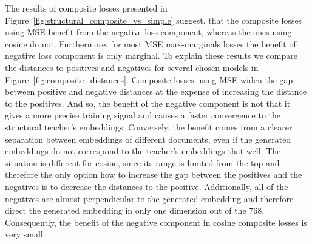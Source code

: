 The results of composite losses presented in
Figure~\ref{fig:structural_composite_vs_simple} suggest, that the composite
losses using MSE benefit from the negative loss component, whereas the ones
using cosine do not. Furthermore, for most MSE max-marginals losses the benefit
of negative loss component is only marginal. To explain these results we
compare the distances to positives and negatives for several chosen models in
Figure~\ref{fig:composite_distances}. Composite losses using MSE widen the gap
between positive and negative distances at the expense of increasing the
distance to the positives. And so, the benefit of the negative component is not
that it gives a more precise training signal and causes a faster convergence to
the structural teacher's embeddings. Conversely, the benefit comes from a
clearer separation between embeddings of different documents, even if the
generated embeddings do not correspond to the teacher's embeddings that well.
The situation is different for cosine, since its range is limited from the top
and therefore the only option how to increase the gap between the positives and
the negatives is to decrease the distances to the positive. Additionally, all
of the negatives are almost perpendicular to the generated embedding and
therefore direct the generated embedding in only one dimension out of the 768.
Consequently, the benefit of the negative component in cosine composite losses
is very small.

